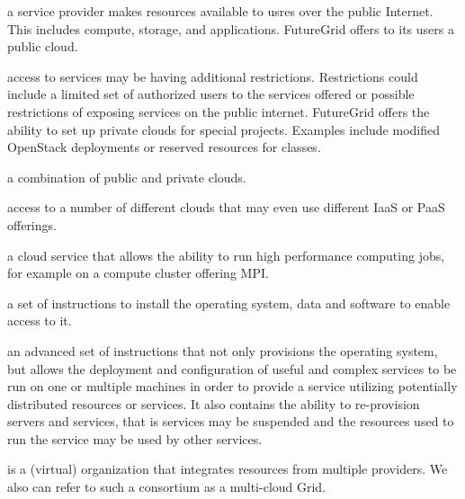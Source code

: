 \documentclass{tex/sig-alternate-2013}
\begin{document}
\begin{description}[leftmargin=*,itemsep=0pt,topsep=0pt]

\item[Public cloud:]  a service provider makes resources available to
  usres over the public Internet. This includes compute, storage, and
  applications. FutureGrid offers to its users a public cloud. 

\item[Private cloud:] access to services may be having additional
  restrictions. Restrictions could include a limited set of authorized
  users to the services offered or  possible restrictions of exposing services on the public
  internet. FutureGrid offers the ability to set up private clouds for
  special projects. Examples include modified OpenStack deployments or
  reserved resources for classes.

\item[Hybrid cloud:] a combination of public and private clouds. 

\item[Multi-cloud:] access to a number of different clouds that may
  even use different IaaS or PaaS offerings. 

\item[HPC service:] a cloud service that allows the ability to run high
  performance computing jobs, for example on a compute cluster
  offering MPI. 

\item[Provisioning:] a set of instructions to install the operating
  system, data and software to enable access to it. 

\item[Rain:] an advanced set of instructions that not only provisions
  the operating system, but allows the deployment and configuration of
  useful and complex services to be run on one or multiple machines in
  order to provide a service utilizing potentially distributed
  resources or services.  It also contains the ability to re-provision
  servers and services, that is services may be suspended and the
  resources used to run the service may be used by other services.

\item[Provider consortium:] is a (virtual) organization that
  integrates resources from multiple providers. We also can refer to
  such a consortium as a multi-cloud Grid.

\end{description}
\end{document}
